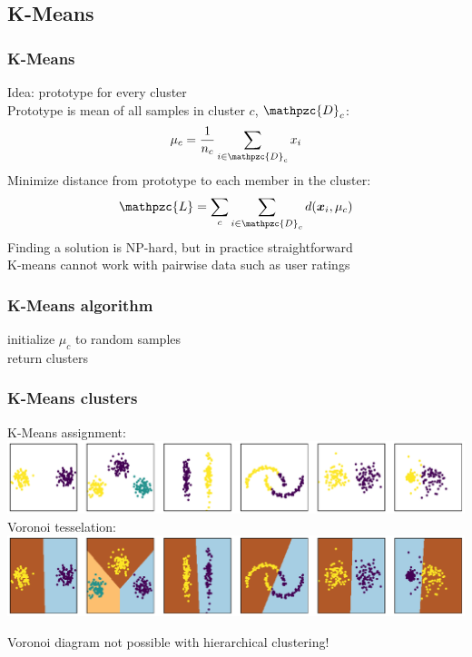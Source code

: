 \documentclass[Nike]{tuberlinbeamer}
\newcommand{\x}{\boldsymbol{x}}
\begin{document}
\subsection{K-Means}
\begin{frame}
  \frametitle{K-Means}
  Idea: prototype for every cluster
  \\
  Prototype is mean of all samples in cluster $c$, $\mathpzc{D}_c$:
  \begin{equation*}
    \mu_c = \frac{1}{n_c} \sum_{i \in \mathpzc{D}_c} x_i
  \end{equation*}
  \pause
  Minimize distance from prototype to each member in the cluster:
  \begin{equation*}
    \mathpzc{L} = \sum_c \sum_{i \in \mathpzc{D}_c} d(\x_i, \mu_c)
  \end{equation*}
  \pause
  Finding a solution is NP-hard, but in practice straightforward
  \\
  K-means cannot work with pairwise data such as user ratings
\end{frame}


\begin{frame}
  \frametitle{K-Means algorithm}
  initialize $\mu_c$ to random samples\\
  return clusters
\end{frame}


\begin{frame}
  \frametitle{K-Means clusters}
  \begin{center}
    K-Means assignment:
    \centering\includegraphics[width=1.0\textwidth]{kmeans_clusters.pdf}
    \pause
    Voronoi tesselation:
    \centering\includegraphics[width=1.0\textwidth]{kmeans_clusters_voronoi.pdf}
  \end{center}
  Voronoi diagram not possible with hierarchical clustering!
\end{frame}
\end{document}
